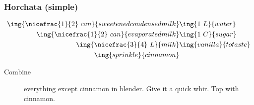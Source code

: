\subsubsection{Horchata (simple)}

\begin{align*}
    \ing{\nicefrac{1}{2}~can}{sweetened condensed milk} & \ing{1~L}{water}        \\
    \ing{\nicefrac{1}{2}~can}{evaporated milk}          & \ing{1~C}{sugar}        \\
    \ing{\nicefrac{3}{4}~L}{milk}                       & \ing{vanilla}{to taste} \\
    \ing{sprinkle}{cinnamon}
\end{align*}

\begin{description}
    \item[Combine]everything except cinnamon in blender. Give it a quick whir. Top with cinnamon.
\end{description}

\pagebreak
